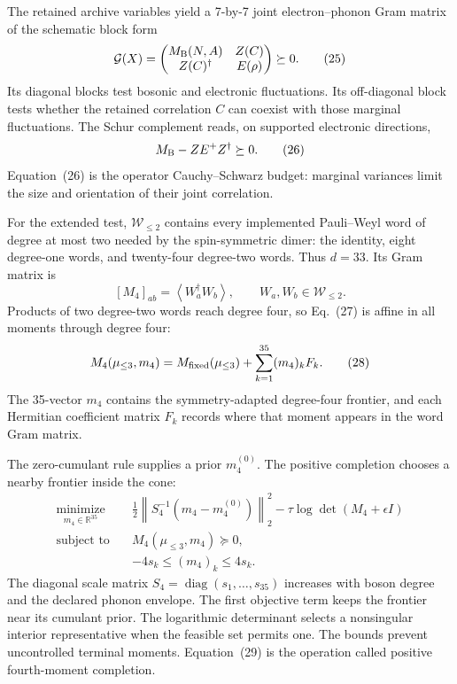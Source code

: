 \documentclass[10pt,letterpaper,twocolumn]{article}
\newcommand{\R}{\mathbb R}
\newcommand{\diag}{\operatorname{diag}}
\newcommand{\expect}[1]{\left\langle #1\right\rangle}
\newcommand{\sectionline}[1]{%
  \Needspace{6\baselineskip}%
  \par\medskip{\color{navy}\large\bfseries #1}\par
  \vspace{-2pt}{\color{navy}\rule{\columnwidth}{0.7pt}}\par\smallskip
}
\begin{document}
The retained archive variables yield a 7-by-7 joint electron--phonon Gram
matrix of the schematic block form
\[
\mathcal G(X)=
\begin{pmatrix}
M_{\rm B}(N,A)&Z(C)\\
Z(C)^\dagger&E(\rho)
\end{pmatrix}\succeq0.
\tag{25}
\]
Its diagonal blocks test bosonic and electronic fluctuations.  Its
off-diagonal block tests whether the retained correlation \(C\) can coexist
with those marginal fluctuations.  The Schur complement reads, on supported
electronic directions,
\[
M_{\rm B}-Z E^+ Z^\dagger\succeq0.
\tag{26}
\]
Equation~(26) is the operator Cauchy--Schwarz budget: marginal variances limit
the size and orientation of their joint correlation.

\sectionline{6. Constructing the extended $M_4$ cone}

For the extended test, \(\mathcal W_{\le2}\) contains every implemented
Pauli--Weyl word of degree at most two needed by the spin-symmetric dimer:
the identity, eight degree-one words, and twenty-four degree-two words.  Thus
\(d=33\).  Its Gram matrix is
\[
[M_4]_{ab}=\expect{W_a^\dagger W_b},
\qquad W_a,W_b\in\mathcal W_{\le2}.
\tag{27}
\]
Products of two degree-two words reach degree four, so Eq.~(27) is affine in
all moments through degree four:
\[
M_4(\mu_{\le3},m_4)
=M_{\rm fixed}(\mu_{\le3})
+\sum_{k=1}^{35}(m_4)_kF_k.
\tag{28}
\]
The 35-vector \(m_4\) contains the symmetry-adapted degree-four frontier, and
each Hermitian coefficient matrix \(F_k\) records where that moment appears in
the word Gram matrix.

The zero-cumulant rule supplies a prior \(m_4^{(0)}\).  The positive completion
chooses a nearby frontier inside the cone:
\[
\begin{aligned}
\underset{m_4\in\R^{35}}{\operatorname{minimize}}\quad
&\frac12\left\|S_4^{-1}(m_4-m_4^{(0)})\right\|_2^2
-\tau\log\det(M_4+\epsilon I)\\
\text{subject to}\quad
&M_4(\mu_{\le3},m_4)\succeq0,\\
&-4s_k\le(m_4)_k\le4s_k.
\end{aligned}
\tag{29}
\]
The diagonal scale matrix \(S_4=\diag(s_1,\ldots,s_{35})\) increases with
boson degree and the declared phonon envelope.  The first objective term keeps
the frontier near its cumulant prior.  The logarithmic determinant selects a
nonsingular interior representative when the feasible set permits one.  The
bounds prevent uncontrolled terminal moments.  Equation~(29) is the operation
called positive fourth-moment completion.
\end{document}
